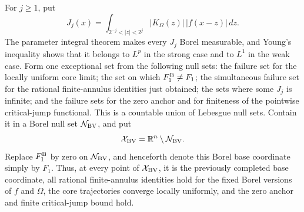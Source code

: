 \documentclass[11pt]{article}
\numberwithin{equation}{section}
\theoremstyle{remark}
\theoremstyle{definition}
\begin{document}
For $j\ge1$, put
\[
 J_j(x)=\int_{2^{-j}<|z|<2^j}
 |K_\Omega(z)|\,|f(x-z)|\,dz.
\]
The parameter integral theorem makes every $J_j$ Borel measurable, and
Young's inequality shows that it belongs to $L^p$ in the strong case and
to $L^1$ in the weak case.  Form one exceptional set from the following
null sets: the failure set for the locally uniform core limit; the set on
which $F_1^{\rm B}\ne F_1$; the simultaneous failure set for the rational
finite-annulus identities just obtained; the sets where some $J_j$ is
infinite; and the failure sets for the zero anchor and for finiteness of
the pointwise critical-jump functional.  This is a countable union of
Lebesgue null sets.  Contain it in a Borel null set
\(\mathcal N_{\rm BV}\), and put
\[
 \mathcal X_{\rm BV}=\mathbb R^n\setminus\mathcal N_{\rm BV}.
\]
Replace $F_1^{\rm B}$ by zero on \(\mathcal N_{\rm BV}\), and henceforth
denote this Borel base coordinate simply by $F_1$.  Thus, at every point
of \(\mathcal X_{\rm BV}\), it is the previously completed base coordinate,
all rational finite-annulus identities hold for the fixed Borel versions
of $f$ and \(\Omega\), the core trajectories converge locally uniformly,
and the zero anchor and finite critical-jump bound hold.
\end{document}
